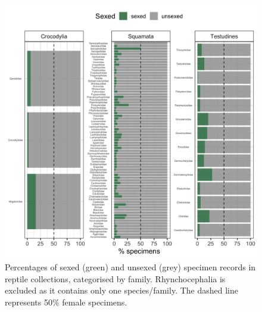 \documentclass[a4paper, 12pt]{article}
\begin{document}
\begin{figure}[H]
 \centering
  \includegraphics[width = \linewidth]{figures/all-unsexed-family-reptiles.png}
  \caption{Percentages of sexed (green) and unsexed (grey) specimen records in reptile collections, categorised by family. Rhynchocephalia is excluded as it contains only one species/family. 
  The dashed line represents 50\% female specimens.}
  \label{fig-reptile-family-unsexed}
\end{figure}


%

\newpage
\end{document}
